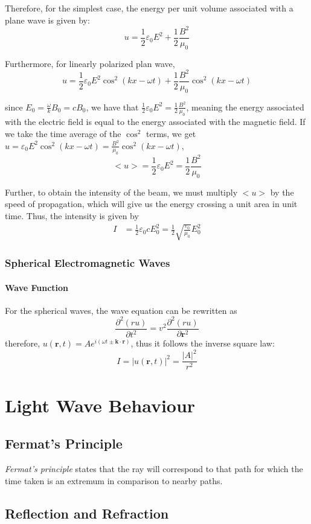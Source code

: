 \documentclass[UTF8]{book}
\begin{document}
Therefore, for the simplest case, the energy per unit volume associated with a plane wave is given by:
\[u=\frac{1}{2}\varepsilon _0E^2+\frac{1}{2}\frac{B^2}{\mu _0}\]

Furthermore, for linearly polarized plan wave,
\[u=\frac{1}{2}\varepsilon _0E^2\cos ^2(kx-\omega t)+\frac{1}{2}\frac{B^2}{\mu _0}\cos ^2(kx-\omega t)\] 

since $E_0=\frac{\omega }{k}B_0=cB_0$, we have that $\frac{1}{2}\varepsilon _0E^2=\frac{1}{2}\frac{B^2}{\mu _0}$, meaning the energy associated with the electric field is equal to the energy associated with the magnetic field. If we take the time average of the $\cos ^2$ terms, we get $u=\varepsilon _0E^2\cos ^2(kx-\omega t)=\frac{B^2}{\mu _0}\cos ^2(kx-\omega t)$,
\[<u>=\frac{1}{2}\varepsilon _0E^2=\frac{1}{2}\frac{B^2}{\mu _0}\]

Further, to obtain the intensity of the beam, we must multiply $<u>$ by the speed of propagation, which will give us the energy crossing a unit area in unit time. Thus, the intensity is given by
\begin{align*}
I&=\frac{1}{2}\varepsilon _0cE_0^2=\frac{1}{2}\sqrt{\frac{\varepsilon _0}{\mu _0}}E_0^2
\end{align*}


\subsection{Spherical Electromagnetic Waves}
\subsubsection{Wave Function}
For the spherical waves, the wave equation can be rewritten as
\[\frac{\partial ^2(ru)}{\partial t^2}=v^2\frac{\partial ^2(ru)}{\partial \mathbf{r}^2}\]
therefore, $u(\mathbf{r},t)=Ae^{i(\omega t\pm \mathbf{k}\cdot \mathbf{r})}$, thus it follows the inverse square law:
\[I=|u(\mathbf{r},t)|^2=\frac{|A|^2}{r^2}\]
\chapter{Light Wave Behaviour}
\section{Fermat’s Principle}
\emph{Fermat's principle} states that the ray will correspond to that path for which the time taken is an extremum in comparison to nearby paths.
\section{Reflection and Refraction}
\end{document}
